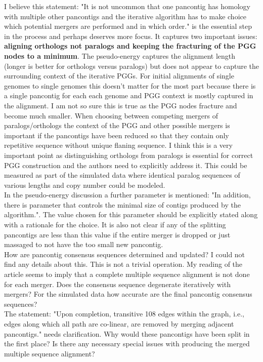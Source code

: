 \documentclass{article}
\begin{document}
I believe this statement: "It is not uncommon that one pancontig has homology with multiple other pancontigs and the iterative algorithm has to make choice which potential mergers are performed and in which order." is the essential step in the process and perhaps deserves more focus. It captures two important issues: \textbf{aligning orthologs not paralogs and keeping the fracturing of the PGG nodes to a minimum}. The pseudo-energy captures the alignment length (longer is better for orthologs versus paralogs) but does not appear to capture the surrounding context of the iterative PGGs. For initial alignments of single genomes to single genomes this doesn't matter for the most part because there is a single pancontig for each each genome and PGG context is mostly captured in the alignment. I am not so sure this is true as the PGG nodes fracture and become much smaller. When choosing between competing mergers of paralogs/orthologs the context of the PGG and other possible mergers is important if the pancontigs have been reduced so that they contain only repetitive sequence without unique flaning sequence. I think this is a very important point as distinguishing orthologs from paralogs is essential for correct PGG construction and the authors need to explicitly address it. This could be measured as part of the simulated data where identical paralog sequences of various lengths and copy number could be modeled.\\

In the pseudo-energy discussion a further parameter is mentioned: "In addition, there is parameter that controls the minimal size of contigs produced by the algorithm.". The value chosen for this parameter should be explicitly stated along with a rationale for the choice. It is also not clear if any of the splitting pancontigs are less than this value if the entire merger is dropped or just massaged to not have the too small new pancontig.\\

How are pancontig consensus sequences determined and updated? I could not find any details about this. This is not a trivial operation. My reading of the article seems to imply that a complete multiple sequence alignment is not done for each merger. Does the consensus sequence degenerate iteratively with mergers? For the simulated data how accurate are the final pancontig consensus sequences?\\

The statement: "Upon completion, transitive 108 edges within the graph, i.e., edges along which all path are co-linear, are removed by merging adjacent pancontigs." needs clarification. Why would these pancontigs have been split in the first place? Is there any necessary special issues with producing the merged multiple sequence alignment?\\
\end{document}
